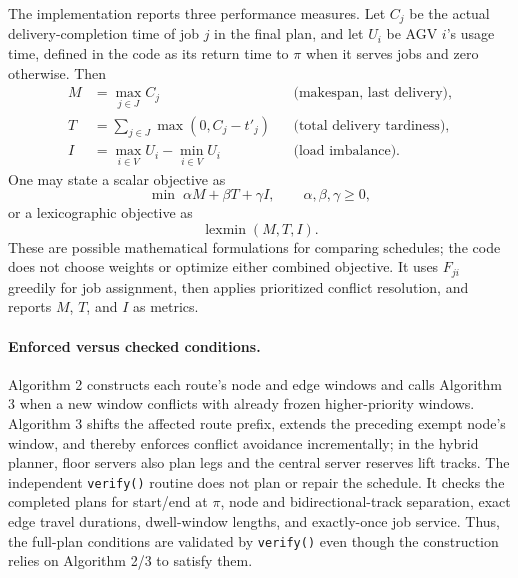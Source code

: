 \documentclass[11pt]{article}
\begin{document}
The implementation reports three performance measures. Let $C_j$ be the
actual delivery-completion time of job $j$ in the final plan, and let $U_i$
be AGV $i$'s usage time, defined in the code as its return time to $\pi$ when
it serves jobs and zero otherwise. Then
\begin{align*}
  M &= \max_{j\in J} C_j
      &&\text{(makespan, last delivery)},\\
  T &= \sum_{j\in J}\max(0,C_j-t'_j)
      &&\text{(total delivery tardiness)},\\
  I &= \max_{i\in V}U_i-\min_{i\in V}U_i
      &&\text{(load imbalance)}.
\end{align*}
One may state a scalar objective as
\[
  \min\; \alpha M+\beta T+\gamma I,
  \qquad \alpha,\beta,\gamma\ge0,
\]
or a lexicographic objective as
\[
  \operatorname{lexmin}(M,T,I).
\]
These are possible mathematical formulations for comparing schedules; the
code does not choose weights or optimize either combined objective. It uses
$F_{ji}$ greedily for job assignment, then applies prioritized conflict
resolution, and reports $M$, $T$, and $I$ as metrics.

\paragraph{Enforced versus checked conditions.}
Algorithm 2 constructs each route's node and edge windows and calls Algorithm
3 when a new window conflicts with already frozen higher-priority windows.
Algorithm 3 shifts the affected route prefix, extends the preceding exempt
node's window, and thereby enforces conflict avoidance incrementally; in the
hybrid planner, floor servers also plan legs and the central server reserves
lift tracks. The independent \texttt{verify()} routine does not plan or repair
the schedule. It checks the completed plans for start/end at $\pi$, node and
bidirectional-track separation, exact edge travel durations, dwell-window
lengths, and exactly-once job service. Thus, the full-plan conditions are
validated by \texttt{verify()} even though the construction relies on
Algorithm 2/3 to satisfy them.
\end{document}
